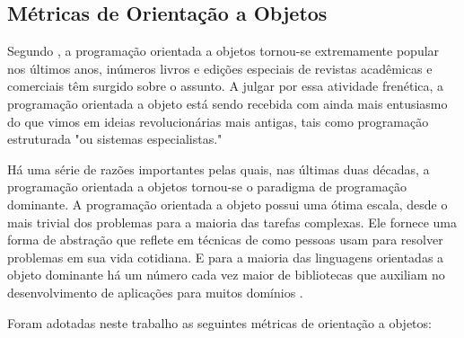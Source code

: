 \subsection{Métricas de Orientação a Objetos}

Segundo , a programação orientada a objetos tornou-se extremamente popular nos últimos anos, inúmeros livros e edições especiais de revistas acadêmicas e comerciais têm surgido sobre o assunto. A julgar por essa atividade frenética, a programação orientada a objeto está sendo recebida com ainda mais entusiasmo do que vimos em ideias revolucionárias mais antigas, tais como programação estruturada "ou sistemas especialistas." 

Há uma série de razões importantes pelas quais, nas últimas duas décadas, a  
programação orientada a objetos tornou-se o paradigma de programação dominante. A programação orientada a objeto possui uma ótima escala, desde o mais trivial dos problemas para a maioria das tarefas complexas. Ele fornece uma forma de abstração que reflete em técnicas de como pessoas usam para resolver problemas em sua vida cotidiana. E para a maioria das linguagens orientadas a objeto dominante há um número cada vez maior de bibliotecas que auxiliam no desenvolvimento de aplicações para muitos domínios \cite{budd_introduction_2002}.

Foram adotadas neste trabalho as seguintes métricas de orientação a objetos:


